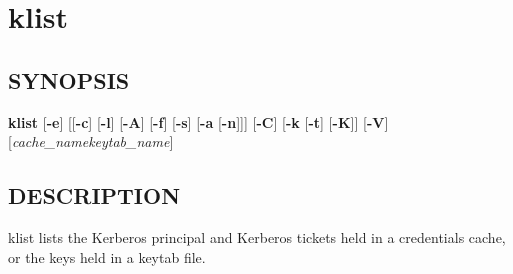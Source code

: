 \documentclass[letterpaper,10pt,english]{sphinxmanual}
\begin{document}
\section{klist}
\label{user/user_commands/klist:klist}\label{user/user_commands/klist::doc}\label{user/user_commands/klist:klist-1}

\subsection{SYNOPSIS}
\label{user/user_commands/klist:synopsis}
\textbf{klist}
{[}\textbf{-e}{]}
{[}{[}\textbf{-c}{]} {[}\textbf{-l}{]} {[}\textbf{-A}{]} {[}\textbf{-f}{]} {[}\textbf{-s}{]} {[}\textbf{-a} {[}\textbf{-n}{]}{]}{]}
{[}\textbf{-C}{]}
{[}\textbf{-k} {[}\textbf{-t}{]} {[}\textbf{-K}{]}{]}
{[}\textbf{-V}{]}
{[}\emph{cache\_name}\textbar{}\emph{keytab\_name}{]}


\subsection{DESCRIPTION}
\label{user/user_commands/klist:description}
klist lists the Kerberos principal and Kerberos tickets held in a
credentials cache, or the keys held in a keytab file.
\end{document}
